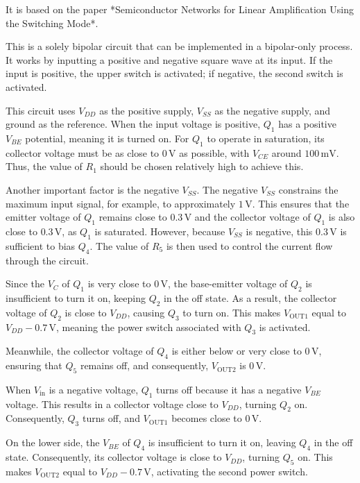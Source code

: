 \documentclass[12pt]{article}
\begin{document}
It is based on the paper *Semiconductor Networks for Linear Amplification Using the Switching Mode*.  

This is a solely bipolar circuit that can be implemented in a bipolar-only process. It works by inputting a positive and negative square wave at its input. If the input is positive, the upper switch is activated; if negative, the second switch is activated.  

This circuit uses $V_{DD}$ as the positive supply, $V_{SS}$ as the negative supply, and ground as the reference. When the input voltage is positive, $Q_1$ has a positive $V_{BE}$ potential, meaning it is turned on. For $Q_1$ to operate in saturation, its collector voltage must be as close to $0 \, \text{V}$ as possible, with $V_{CE}$ around $100 \, \text{mV}$. Thus, the value of $R_1$ should be chosen relatively high to achieve this.  

Another important factor is the negative $V_{SS}$. The negative $V_{SS}$ constrains the maximum input signal, for example, to approximately $1 \, \text{V}$. This ensures that the emitter voltage of $Q_1$ remains close to $0.3 \, \text{V}$ and the collector voltage of $Q_1$ is also close to $0.3 \, \text{V}$, as $Q_1$ is saturated. However, because $V_{SS}$ is negative, this $0.3 \, \text{V}$ is sufficient to bias $Q_4$. The value of $R_5$ is then used to control the current flow through the circuit.  

Since the $V_C$ of $Q_1$ is very close to $0 \, \text{V}$, the base-emitter voltage of $Q_2$ is insufficient to turn it on, keeping $Q_2$ in the off state. As a result, the collector voltage of $Q_2$ is close to $V_{DD}$, causing $Q_3$ to turn on. This makes $V_{\text{OUT1}}$ equal to $V_{DD} - 0.7 \, \text{V}$, meaning the power switch associated with $Q_3$ is activated.  

Meanwhile, the collector voltage of $Q_4$ is either below or very close to $0 \, \text{V}$, ensuring that $Q_5$ remains off, and consequently, $V_{\text{OUT2}}$ is $0 \, \text{V}$.  

When $V_{\text{in}}$ is a negative voltage, $Q_1$ turns off because it has a negative $V_{BE}$ voltage. This results in a collector voltage close to $V_{DD}$, turning $Q_2$ on. Consequently, $Q_3$ turns off, and $V_{\text{OUT1}}$ becomes close to $0 \, \text{V}$.  

On the lower side, the $V_{BE}$ of $Q_4$ is insufficient to turn it on, leaving $Q_4$ in the off state. Consequently, its collector voltage is close to $V_{DD}$, turning $Q_5$ on. This makes $V_{\text{OUT2}}$ equal to $V_{DD} - 0.7 \, \text{V}$, activating the second power switch.
\end{document}
